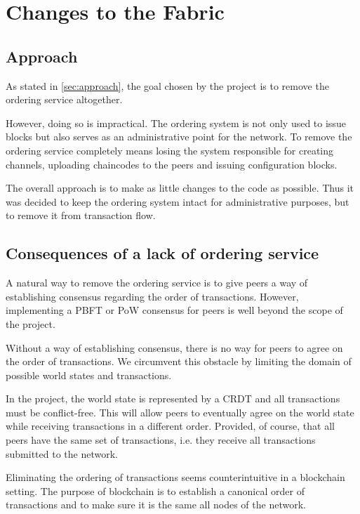 \chapter{Changes to the Fabric}\label{chapter:fabric}
\section{Approach} \label{sec:app-approach}
As stated in \ref{sec:approach}, the goal chosen by the project is to remove the ordering service altogether.

However, doing so is impractical. The ordering system is not only used to issue blocks but also serves as an administrative point for the network. To remove the ordering service completely means losing the system responsible for creating channels, uploading chaincodes to the peers and issuing configuration blocks.

The overall approach is to make as little changes to the code as possible.
Thus it was decided to keep the ordering system intact for administrative purposes, but to remove it from transaction flow.

\section{Consequences of a lack of ordering service}
\label{sec:app-noorder}

A natural way to remove the ordering service is to give peers a way of establishing consensus regarding the order of transactions. However, implementing a PBFT or PoW consensus for peers is well beyond the scope of the project.

Without a way of establishing consensus, there is no way for peers to agree on the order of transactions. We circumvent this obstacle by limiting the domain of possible world states and transactions.

In the project, the world state is represented by a CRDT and all transactions must be conflict-free. This will allow peers to eventually agree on the world state while receiving transactions in a different order. Provided, of course, that all peers have the same set of transactions, i.e. they receive all transactions submitted to the network.

Eliminating the ordering of transactions seems counterintuitive in a blockchain setting. The purpose of blockchain is to establish a canonical order of transactions and to make sure it is the same all nodes of the network.


